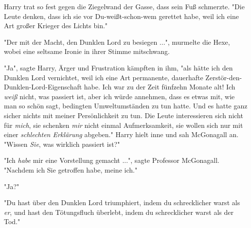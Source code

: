 Harry trat so fest gegen die Ziegelwand der Gasse, dass sein Fuß schmerzte. "Die Leute denken, dass ich sie vor Du-weißt-schon-wem gerettet habe, weil ich eine Art großer Krieger des Lichts bin." 

"Der mit der Macht, den Dunklen Lord zu besiegen ...", murmelte die Hexe, wobei eine seltsame Ironie in ihrer Stimme mitschwang. 

"Ja", sagte Harry, Ärger und Frustration kämpften in ihm, "als hätte ich den Dunklen Lord vernichtet, weil ich eine Art permanente, dauerhafte Zerstör-den-Dunklen-Lord-Eigenschaft habe. Ich war zu der Zeit fünfzehn Monate alt! Ich \emph{weiß} nicht, was passiert ist, aber ich würde annehmen, dass es etwas mit, wie man so schön sagt, bedingten Umweltumständen zu tun hatte. Und es hatte ganz sicher nichts mit meiner Persönlichkeit zu tun. Die Leute interessieren sich nicht für \emph{mich}, sie schenken \emph{mir} nicht einmal Aufmerksamkeit, sie wollen sich nur mit einer \emph{schlechten Erklärung} abgeben." Harry hielt inne und sah McGonagall an. "Wissen \emph{Sie}, was wirklich passiert ist?" 

"Ich \emph{habe} mir eine Vorstellung gemacht ...", sagte Professor McGonagall. "Nachdem ich Sie getroffen habe, meine ich."

"Ja?" 

"Du hast über den Dunklen Lord triumphiert, indem du schrecklicher warst als \emph{er}, und hast den Tötungsfluch überlebt, indem du schrecklicher warst als der Tod."

